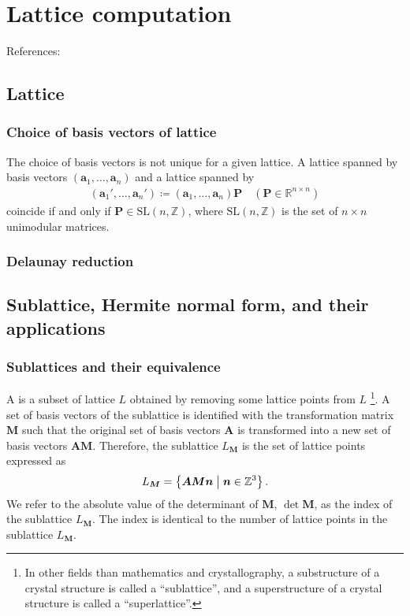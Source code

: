 \section{\label{sec:lattice}Lattice computation}

References: \cite{Hart2008,Hart2009,Cohen1993,CSE206A}

\subsection{Lattice}

\subsubsection{Choice of basis vectors of lattice}

The choice of basis vectors is not unique for a given lattice.
A lattice spanned by basis vectors $( \bm{a}_{1}, \dots, \bm{a}_{n} )$ and a lattice spanned by
\begin{align*}
  ( \bm{a}_{1}', \dots, \bm{a}_{n}' ) \coloneqq ( \bm{a}_{1}, \dots, \bm{a}_{n} ) \bm{P} \quad (\bm{P} \in \mathbb{R}^{n \times n})
\end{align*}
coincide if and only if $\bm{P} \in \mathrm{SL}(n, \mathbb{Z})$, where $ \mathrm{SL}(n, \mathbb{Z})$ is the set of $n \times n$ unimodular matrices.

\subsubsection{Delaunay reduction}

\subsection{Sublattice, Hermite normal form, and their applications}

\subsubsection{Sublattices and their equivalence}

A  is a subset of lattice $L$ obtained by removing some lattice points from $L$ \footnote{
  In other fields than mathematics and crystallography, a substructure of a crystal structure is called a ``sublattice'', and a superstructure of a crystal structure is called a ``superlattice''.
}.
A set of basis vectors of the sublattice is identified with the transformation matrix $\bm{M}$ such that the original set of basis vectors $\bm{A}$ is transformed into a new set of basis vectors $\bm{AM}$.
Therefore, the sublattice $L_{\bm{M}}$ is the set of lattice points expressed as
\begin{align}
  L_{\bm{M}} = \left\{  \bm{AMn}  \mathrel{}\middle|\mathrel{}  \bm{n} \in \mathbb{Z}^{3}  \right\}.
\end{align}
We refer to the absolute value of the determinant of $\bm{M}$, $\det \bm{M}$, as the index of the sublattice $L_{\bm{M}}$.
The index is identical to the number of lattice points in the sublattice $L_{\bm{M}}$.

